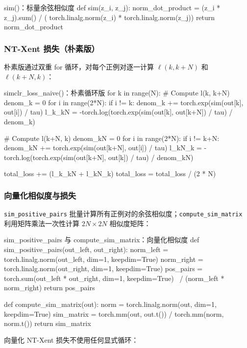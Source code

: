 \begin{codeblock}{sim()：标量余弦相似度}
def sim(z_i, z_j):
    norm_dot_product = (z_i * z_j).sum() / (
        torch.linalg.norm(z_i) * torch.linalg.norm(z_j))
    return norm_dot_product
\end{codeblock}

\subsubsection{NT-Xent 损失（朴素版）}
朴素版通过双重 for 循环，对每个正例对逐一计算 $\ell(k, k+N)$ 和 $\ell(k+N, k)$：

\begin{codeblock}{simclr\_loss\_naive()：朴素循环版}
for k in range(N):
    # Compute l(k, k+N)
    denom_k = 0
    for i in range(2*N):
        if i != k:
            denom_k += torch.exp(sim(out[k], out[i]) / tau)
    l_k_kN = -torch.log(torch.exp(sim(out[k], out[k+N]) / tau) / denom_k)

    # Compute l(k+N, k)
    denom_kN = 0
    for i in range(2*N):
        if i != k+N:
            denom_kN += torch.exp(sim(out[k+N], out[i]) / tau)
    l_kN_k = -torch.log(torch.exp(sim(out[k+N], out[k]) / tau) / denom_kN)

    total_loss += (l_k_kN + l_kN_k)
total_loss = total_loss / (2 * N)
\end{codeblock}

\subsubsection{向量化相似度与损失}
\texttt{sim\_positive\_pairs} 批量计算所有正例对的余弦相似度；\texttt{compute\_sim\_matrix} 利用矩阵乘法一次性计算 $2N \times 2N$ 相似度矩阵：

\begin{codeblock}{sim\_positive\_pairs 与 compute\_sim\_matrix：向量化相似度}
def sim_positive_pairs(out_left, out_right):
    norm_left = torch.linalg.norm(out_left, dim=1, keepdim=True)
    norm_right = torch.linalg.norm(out_right, dim=1, keepdim=True)
    pos_pairs = torch.sum(out_left * out_right, dim=1, keepdim=True) \
                / (norm_left * norm_right)
    return pos_pairs

def compute_sim_matrix(out):
    norm = torch.linalg.norm(out, dim=1, keepdim=True)
    sim_matrix = torch.mm(out, out.t()) / torch.mm(norm, norm.t())
    return sim_matrix
\end{codeblock}

向量化 NT-Xent 损失不使用任何显式循环：


